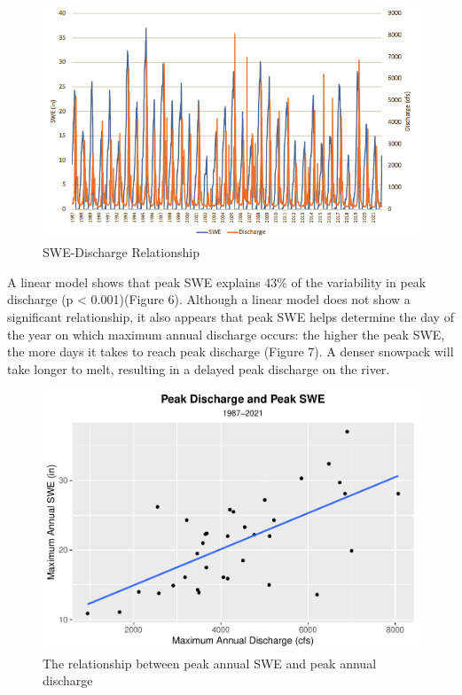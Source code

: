 \documentclass[
  12pt,
]{article}
\begin{document}
\begin{figure}
\centering
\includegraphics{snowpack_discharge_plot.png}
\caption{SWE-Discharge Relationship}
\end{figure}

A linear model shows that peak SWE explains 43\% of the variability in
peak discharge (p \textless{} 0.001)(Figure 6). Although a linear model
does not show a significant relationship, it also appears that peak SWE
helps determine the day of the year on which maximum annual discharge
occurs: the higher the peak SWE, the more days it takes to reach peak
discharge (Figure 7). A denser snowpack will take longer to melt,
resulting in a delayed peak discharge on the river.

\begin{figure}
\centering
\includegraphics{Final_Report_files/figure-latex/unnamed-chunk-4-1.pdf}
\caption{The relationship between peak annual SWE and peak annual
discharge}
\end{figure}
\end{document}
